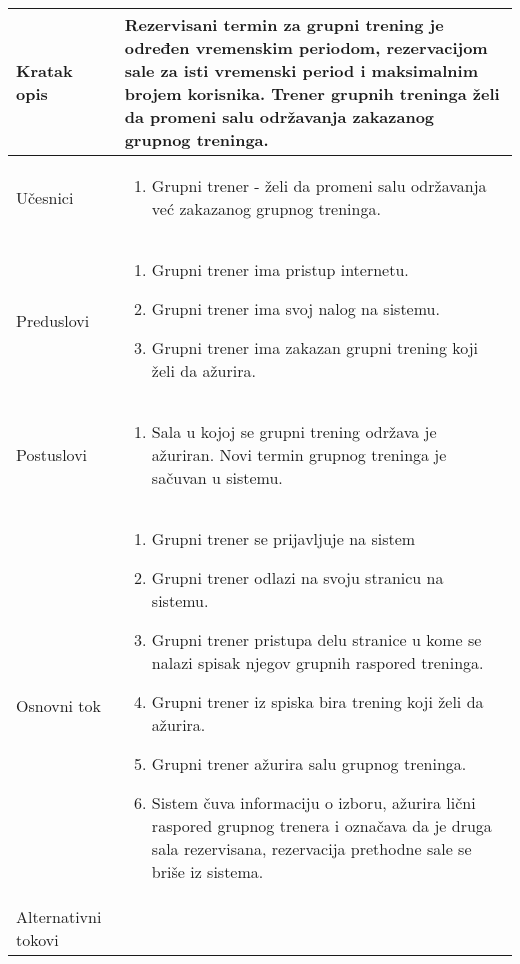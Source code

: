 \documentclass[../grupniTreninzi.tex]{subfiles}
\begin{document}
\begin{longtable}{| p{} | p{} |} 
\hline
    Kratak opis & Rezervisani termin za grupni trening je određen vremenskim periodom, rezervacijom sale za isti vremenski period i maksimalnim brojem korisnika. Trener grupnih treninga želi da promeni salu održavanja zakazanog grupnog treninga.\\ 
\hline    
    Učesnici &
    \begin{enumerate}
        \item Grupni trener - želi da promeni salu održavanja već zakazanog grupnog treninga.
    \end{enumerate}\\
\hline
   Preduslovi & 
   \begin{enumerate}
        \item Grupni trener ima pristup internetu.
        \item Grupni trener ima svoj nalog na sistemu.
        \item Grupni trener ima zakazan grupni trening koji želi da ažurira.
    \end{enumerate}\\
\hline  
    Postuslovi &
    \begin{enumerate}
        \item Sala u kojoj se grupni trening održava je ažuriran. Novi termin grupnog treninga je sačuvan u sistemu.
    \end{enumerate}\\
\hline
    Osnovni tok & 
    \begin{enumerate}
        \item Grupni trener se prijavljuje na sistem
        \item Grupni trener odlazi na svoju stranicu na sistemu.
        \item Grupni trener pristupa delu stranice u kome se nalazi spisak njegov grupnih raspored treninga.
        \item Grupni trener iz spiska bira trening koji želi da ažurira.
        \item Grupni trener ažurira salu grupnog treninga.
        \item Sistem čuva informaciju o izboru, ažurira lični raspored grupnog trenera i označava da je druga sala rezervisana, rezervacija prethodne sale se briše iz sistema.
    \end{enumerate}\\
\hline
    Alternativni tokovi & 
       \begin{enumerate}

\end{enumerate}
\end{longtable}
\end{document}

